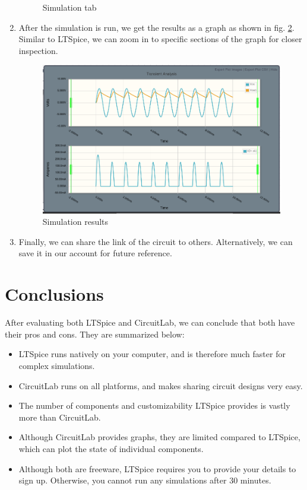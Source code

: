 \documentclass{article}
\begin{document}
\begin{enumerate}
\begin{figure}[h]
		\caption[Simulation tab]{Simulation tab}
		\label{fig:simulation}
	\end{figure}
	\item After the simulation is run, we get the results as a graph as shown in fig. \ref{fig:graphs}. Similar to LTSpice, we can zoom in to specific sections of the graph for closer inspection.
	\begin{figure}[h]
		\centering
		\includegraphics[width=0.7\linewidth]{graphs}
		\caption[Simulation results]{Simulation results}
		\label{fig:graphs}
	\end{figure}
	\item Finally, we can share the link of the circuit to others. Alternatively, we can save it in our account for future reference.


\end{enumerate}
\pagebreak

\section{Conclusions}

After evaluating both LTSpice and CircuitLab, we can conclude that both have their pros and cons. They are summarized below:
\begin{itemize}
	\item LTSpice runs natively on your computer, and is therefore much faster for complex simulations.
	\item CircuitLab runs on all platforms, and makes sharing circuit designs very easy.
	\item The number of components and customizability LTSpice provides is vastly more than CircuitLab.
	\item Although CircuitLab provides graphs, they are limited compared to LTSpice, which can plot the state of individual components.
	\item Although both are freeware, LTSpice requires you to provide your details to sign up. Otherwise, you cannot run any simulations after 30 minutes.
\end{itemize}
\end{document}

